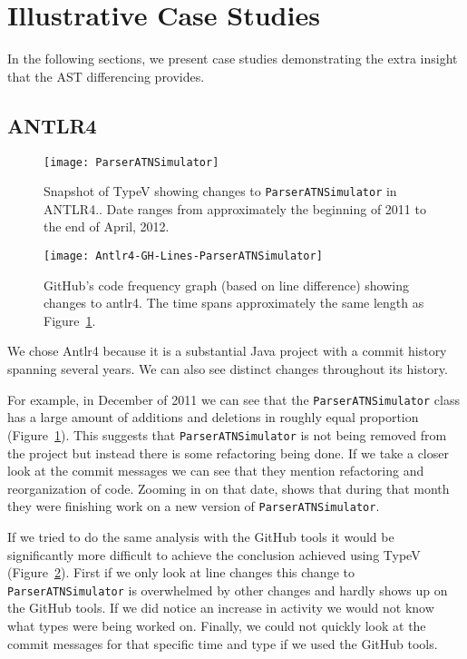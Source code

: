 \section{Illustrative Case Studies}

In the following sections, we present case studies demonstrating the extra insight that the AST differencing provides.

\subsection{ANTLR4}

\begin{figure}[!ht]
\centering
\texttt{[image: ParserATNSimulator]}
\caption{Snapshot of TypeV showing changes to \texttt{ParserATNSimulator} in ANTLR4.. Date ranges from approximately the beginning of 2011 to the end of April, 2012.}
\label{fig:parser1}
\end{figure}

\begin{figure}[!ht]
\centering
\texttt{[image: Antlr4-GH-Lines-ParserATNSimulator]}
\caption{GitHub's code frequency graph (based on line difference) showing changes to antlr4. The time spans approximately the same length as Figure~\ref{fig:parser1}.}
\label{fig:parser2}
\end{figure}

We chose Antlr4 because it is a substantial Java project with a commit history spanning several years. We can also see distinct changes throughout its history.

For example, in December of 2011 we can see that the \texttt{ParserATNSimulator} class has a large amount of additions and deletions in roughly equal proportion (Figure~\ref{fig:parser1}). This suggests that \texttt{ParserATNSimulator} is not being removed from the project but instead there is some refactoring being done. If we take a closer look at the commit messages we can see that they mention refactoring and reorganization of code. Zooming in on that date,  shows that during that month they were finishing work on a new version of \texttt{ParserATNSimulator}.

If we tried to do the same analysis with the GitHub tools it would be significantly more difficult to achieve the conclusion achieved using TypeV (Figure~\ref{fig:parser2}). First if we only look at line changes this change to \texttt{ParserATNSimulator} is overwhelmed by other changes and hardly shows up on the GitHub tools. If we did notice an increase in activity we would not know what types were being worked on. Finally, we could not quickly look at the commit messages for that specific time and type if we used the GitHub tools.

